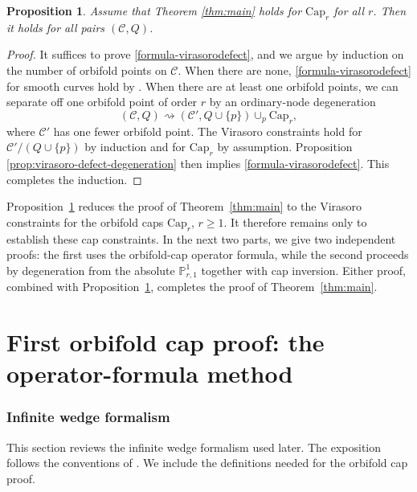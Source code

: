 \documentclass[letterpaper,12pt]{amsart}
\newtheorem{prop}[thm]{Proposition}
\theoremstyle{definition}
\newcommand{\PP}{\mathbb P}
\newcommand{\cC}{\mathcal C}
\newcommand{\OrbCap}{\mathrm{Cap}}
\numberwithin{equation}{section}
\begin{document}
\begin{prop}\label{prop:red2orbicap}
Assume that Theorem \ref{thm:main} holds for  \(\OrbCap_r\) for all \(r\). Then it holds for all pairs $(\cC,Q)$.
\end{prop}

\begin{proof}
It suffices to prove \eqref{formula-virasorodefect}, and we argue by induction on the number of orbifold points on $\cC$.  When there are none, \eqref{formula-virasorodefect} for smooth curves hold by \cite{OP3}.  When there are at least one orbifold points,
we can separate off one orbifold point of order \(r\) by an ordinary-node degeneration
\[
(\cC,Q)
\rightsquigarrow
(\cC',Q\cup\{p\})
\cup_p
\OrbCap_r,
\]
where \(\cC'\) has one fewer orbifold point.  The Virasoro constraints hold
for \(\cC'/(Q\cup\{p\})\) by induction and for \(\OrbCap_r\) by assumption.
Proposition \ref{prop:virasoro-defect-degeneration} then implies \eqref{formula-virasorodefect}. This completes the induction.
\end{proof}




Proposition~\ref{prop:red2orbicap} reduces the proof of
Theorem~\ref{thm:main} to the Virasoro constraints for the orbifold caps
\(\OrbCap_r\), \(r\geq 1\).  It therefore remains only to establish these
cap constraints.  In the next two parts, we give two independent proofs:
the first uses the orbifold-cap operator formula, while the second proceeds
by degeneration from the absolute $\PP^1_{r,1}$ together with cap inversion.
Either proof, combined with Proposition~\ref{prop:red2orbicap}, completes the
proof of Theorem~\ref{thm:main}.



{\large \part{First orbifold cap proof: the operator-formula method}\label{part:operator-proof}}


\section{Infinite wedge formalism}\label{sec:wedge}


This section reviews the infinite wedge formalism used later.  The exposition follows the conventions of \cites{OP3,J,KW23}. We include the definitions needed for the orbifold cap proof.
\end{document}
